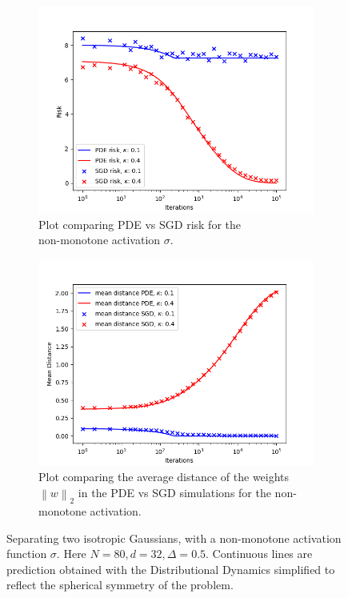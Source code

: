 \documentclass{article}
\theoremstyle{mystyle}
\newcommand{\norm}[1]{\left\lVert#1\right\rVert}
\begin{document}
    \begin{figure}[H]
\begin{subfigure}{0.5\textwidth}
  \centering
  \includegraphics[width=\linewidth]{images/NGuyen2018-pde-sgd-risk-iso-gauss-non-mon.png}
  \caption{Plot comparing PDE vs SGD risk for the\\  non-monotone activation $ \sigma$.}
  \label{fig: pde vs sgd non-monotone}
\end{subfigure}%
\begin{subfigure}{0.5\textwidth}
  \centering
  \includegraphics[width=\linewidth]{images/NGuyen2018-pde-sgd-iso-gauss-non-mon.png}
  \caption{ Plot comparing the average distance of the weights $ \norm{w}_{2}$ in the PDE vs SGD simulations for the non-monotone activation.}
  \label{fig: avg distance pde sgd non-monotone}
\end{subfigure}
\caption{ Separating two isotropic Gaussians, with a non-monotone activation function $ \sigma$. Here $N = 80, d = 32, \Delta = 0.5$. Continuous lines are prediction
obtained with the Distributional Dynamics simplified to reflect the spherical symmetry of the problem.
}
\label{fig:  non-monotone simulation sgd vs pde}
\end{figure}
\end{document}
